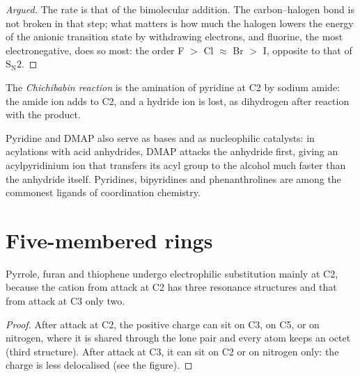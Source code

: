 \begin{proof}[Argued]
The rate is that of the bimolecular addition. The carbon--halogen bond is not
broken in that step; what matters is how much the halogen lowers the energy of
the anionic transition state by withdrawing electrons, and fluorine, the most
electronegative, does so most: the order F $>$ Cl $\approx$ Br $>$ I, opposite to that of $\mathrm S_\mathrm N2$.
\end{proof}

\begin{definition}\label{def:b3:heterocycles:chichibabin}
The \emph{Chichibabin reaction} is the amination of
pyridine at C2 by sodium amide: the amide ion adds to C2, and a hydride ion is
lost, as dihydrogen after reaction with the product.
\end{definition}

Pyridine and DMAP also serve as bases and as nucleophilic catalysts: in
acylations with acid anhydrides, DMAP attacks the anhydride first, giving an
acylpyridinium ion that transfers its acyl group to the alcohol much faster than
the anhydride itself. Pyridines, bipyridines and phenanthrolines are among the
commonest ligands of coordination chemistry.

\section{Five-membered rings}

\begin{proposition}\label{prop:b3:heterocycles:pyrrole-c2}
Pyrrole, furan and thiophene undergo electrophilic substitution mainly at C2,
because the cation from attack at C2 has three resonance structures and that
from attack at C3 only two.
\end{proposition}

\begin{proof}
After attack at C2, the positive charge can sit on C3, on C5, or on nitrogen,
where it is shared through the lone pair and every atom keeps an octet (third
structure). After attack at C3, it can sit on C2 or on nitrogen only: the charge
is less delocalised (see the figure).
\end{proof}

